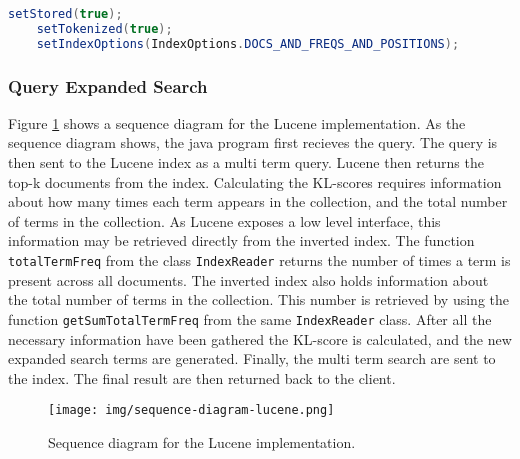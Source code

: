 \begin{lstlisting}[language=java, caption={Lucene's \texttt{TextField} index configuration.}, label={lst:lucene-text-field}]
    setStored(true);
    setTokenized(true);
    setIndexOptions(IndexOptions.DOCS_AND_FREQS_AND_POSITIONS);
\end{lstlisting}

\subsubsection{Query Expanded Search}
Figure \ref{fig:sequence-diagram-lucene} shows a sequence diagram for the Lucene implementation.
As the sequence diagram shows, the java program first recieves the query.
The query is then sent to the Lucene index as a multi term query.
Lucene then returns the top-k documents from the index.
Calculating the KL-scores requires information about how many times each term appears in the collection,
and the total number of terms in the collection.
As Lucene exposes a low level interface,
this information may be retrieved directly from the inverted index.
The function \texttt{totalTermFreq} from the class \texttt{IndexReader} returns the number of times a term is present across all documents.
The inverted index also holds information about the total number of terms in the collection.
This number is retrieved by using the function \texttt{getSumTotalTermFreq} from the same \texttt{IndexReader} class.
After all the necessary information have been gathered the KL-score is calculated,
and the new expanded search terms are generated.
Finally, the multi term search are sent to the index.
The final result are then returned back to the client.

\begin{figure}[h!]
  \centering \texttt{[image: img/sequence-diagram-lucene.png]}
  \caption{Sequence diagram for the Lucene implementation.}
  \label{fig:sequence-diagram-lucene}
\end{figure}
